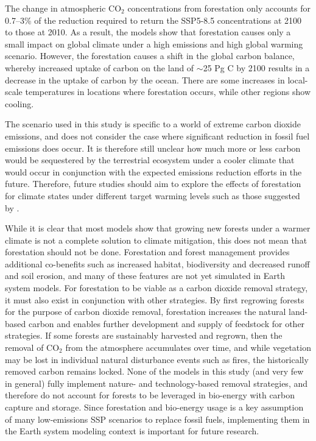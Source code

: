 \documentclass[]{article}
\begin{document}
The change in atmospheric CO$_2$ concentrations from forestation only accounts for 0.7--3\% of the reduction required to return the SSP5-8.5 concentrations at 2100 to those at 2010.
As a result, the models show that forestation causes only a small impact on global climate under a high emissions and high global warming scenario.
However, the forestation causes a shift in the global carbon balance, whereby increased uptake of carbon on the land of $\sim$25 Pg C by 2100 results in a decrease in the uptake of carbon by the ocean.
There are some increases in local-scale temperatures in locations where forestation occurs, while other regions show cooling.

The scenario used in this study is specific to a world of extreme carbon dioxide emissions, and does not consider the case where significant reduction in fossil fuel emissions does occur.
It is therefore still unclear how much more or less carbon would be sequestered by the terrestrial ecosystem under a cooler climate that would occur in conjunction with the expected emissions reduction efforts in the future.
Therefore, future studies should aim to explore the effects of forestation for climate states under different target warming levels such as those suggested by \cite{king_studying_2021}.

While it is clear that most models show that growing new forests under a warmer climate is not a complete solution to climate mitigation, this does not mean that forestation should not be done.
Forestation and forest management provides additional co-benefits such as increased habitat, biodiversity and decreased runoff and soil erosion, and many of these features are not yet simulated in Earth system models.
For forestation to be viable as a carbon dioxide removal strategy, it must also exist in conjunction with other strategies.
By first regrowing forests for the purpose of carbon dioxide removal, forestation increases the natural land-based carbon and enables further development and supply of feedstock for other strategies.
If some forests are sustainably harvested and regrown, then the removal of CO$_2$ from the atmosphere accumulates over time, and while vegetation may be lost in individual natural disturbance events such as fires, the historically removed carbon remains locked.
None of the models in this study (and very few in general) fully implement nature- and technology-based removal strategies, and therefore do not account for forests to be leveraged in bio-energy with carbon capture and storage.
Since forestation and bio-energy usage is a key assumption of many low-emissions SSP scenarios to replace fossil fuels, implementing them in the Earth system modeling context is important for future research.
\end{document}
